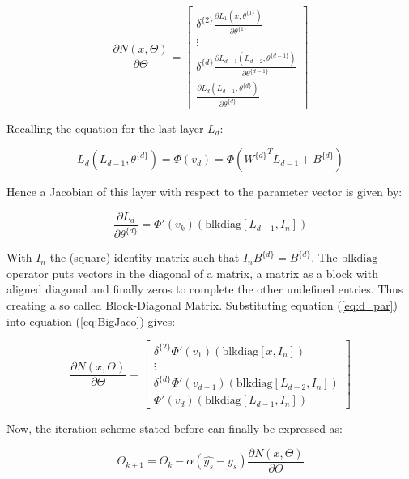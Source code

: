 \documentclass[10pt,journal,compsoc]{IEEEtran}
\newcommand{\ce}[1]{equation (\ref{#1})}
\newcommand{\pd}[2]{\frac{\partial #1}{\partial #2}}
\begin{document}
\begin{equation}
	\label{eq:BigJacodelta}
	\pd{N(x, \Theta)}{\Theta} = \begin{bmatrix}
		\delta^{\{ 2 \}} \pd{L_{1}(x, \theta^{\{ 1 \}})}{\theta^{\{ 1 \}}} \\
		\vdots \\
		\delta^{\{ d \}} \pd{L_{d-1}(L_{d-2}, \theta^{\{ d-1 \}})}{\theta^{\{ d-1 \}}} \\
		 \pd{L_d(L_{d-1}, \theta^{\{ d \}})}{\theta^{\{ d \}}}
		\end{bmatrix}
\end{equation}

Recalling the equation for the last layer $L_d$:

 \begin{equation}
 	L_d(L_{d-1}, \theta^{\{ d \}}) = \Phi(v_d) = \Phi({W^{\{ d \}}}^TL_{d-1}+B^{\{ d \}})
 \end{equation}

Hence a Jacobian of this layer with respect to the parameter vector is given by:

\begin{equation}\label{eq:d_par}
	\pd{L_d}{\theta^{\{ d \}}}  = \Phi'(v_k) \left( \text{blkdiag}\left[L_{d-1}, I_n\right]\right)
\end{equation}

With $I_n$ the (square) identity matrix such that $I_n B^{\{ d \}} = B^{\{ d \}}$. The $\text{blkdiag}$ operator puts vectors in the diagonal of a matrix, a matrix as a block with aligned diagonal and finally zeros to complete the other undefined entries. Thus creating a so called Block-Diagonal Matrix. Substituting \ce{eq:d_par} into \ce{eq:BigJaco} gives: 

\begin{equation}
	\label{eq:BigJacodelta}
	\pd{N(x, \Theta)}{\Theta} = \begin{bmatrix}
		\delta^{\{ 2 \}} \Phi'(v_1) \left( \text{blkdiag}\left[x, I_n\right]\right) \\
		\vdots \\
		\delta^{\{ d \}} \Phi'(v_{d-1}) \left( \text{blkdiag}\left[L_{d-2}, I_n\right]\right) \\
		\Phi'(v_d) \left( \text{blkdiag}\left[L_{d-1}, I_n\right]\right)
		\end{bmatrix}
\end{equation}

Now, the iteration scheme stated before can finally be expressed as:

\begin{equation}
	\Theta_{k+1} = \Theta_k - \alpha \left( \widehat{y_s} - y_s \right) \pd{N(x, \Theta)}{\Theta}
\end{equation}
\end{document}

